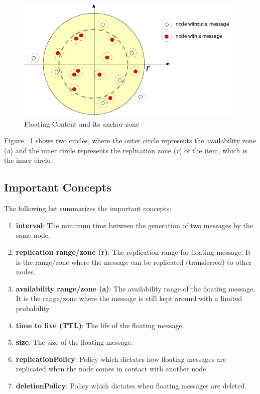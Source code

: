 \begin{figure}[h]
\centering
\includegraphics{./figures/anchor-zone}
\caption{Floating-Content and its anchor zone \cite{floating-content-1}}
\label{fig:floating-content}
\end{figure}
Figure ~\ref{fig:floating-content} shows two circles, where the outer circle represents the availability zone (\textit{a}) and the inner circle represents the replication zone (\textit{r}) of the item, which is the inner circle.

\subsection{Important Concepts}
The following list summarizes the important concepts:
\begin{enumerate}
  \item \textbf{interval}: The minimum time between the generation of two messages by the same node.
  \item \textbf{replication range/zone (r)}: The replication range for floating message. It is the range/zone where the message can be replicated (transferred) to other nodes.
  \item \textbf{availability range/zone (a)}: The availability range of the floating message. It is the range/zone where the message is still kept around with a limited probability.
  \item \textbf{time to live (TTL)}: The life of the floating message.
  \item \textbf{size}: The size of the floating message.
  \item \textbf{replicationPolicy}: Policy which dictates how floating messages are replicated when the node comes in contact with another node.
  \item \textbf{deletionPolicy}: Policy which dictates when floating messages are deleted.
\end{enumerate}

